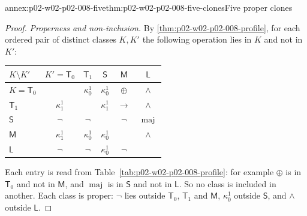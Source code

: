 \begin{annexitem}{annex:p02-w02-p02-008-five}{thm:p02-w02-p02-008-five-clones}{Five proper clones}
\begin{proof}
\emph{Properness and non-inclusion.}  By
\cref{thm:p02-w02-p02-008-profile}, for each ordered pair of distinct
classes \(K,K'\) the following operation lies in \(K\) and not in \(K'\):
\begin{center}\small
\begin{tabular}{@{}l|ccccc@{}}
\(K\setminus K'\) & \(K'=\mathsf T_0\) & \(\mathsf T_1\) & \(\mathsf S\) & \(\mathsf M\) & \(\mathsf L\)\\\hline
\(K=\mathsf T_0\) & & \(\kappa^1_0\) & \(\kappa^1_0\) & \(\oplus\) & \(\land\)\\
\(\mathsf T_1\) & \(\kappa^1_1\) & & \(\kappa^1_1\) & \(\to\) & \(\land\)\\
\(\mathsf S\) & \(\neg\) & \(\neg\) & & \(\neg\) & \(\operatorname{maj}\)\\
\(\mathsf M\) & \(\kappa^1_1\) & \(\kappa^1_0\) & \(\kappa^1_0\) & & \(\land\)\\
\(\mathsf L\) & \(\neg\) & \(\neg\) & \(\kappa^1_0\) & \(\neg\) &
\end{tabular}
\end{center}
Each entry is read from Table~\ref{tab:p02-w02-p02-008-profile}: for example
\(\oplus\) is in \(\mathsf T_0\) and not in \(\mathsf M\), and
\(\operatorname{maj}\) is in \(\mathsf S\) and not in \(\mathsf L\).  So no
class is included in another.  Each class is proper: \(\neg\) lies outside
\(\mathsf T_0\), \(\mathsf T_1\) and \(\mathsf M\), \(\kappa^1_0\) outside
\(\mathsf S\), and \(\land\) outside \(\mathsf L\).
\end{proof}
\end{annexitem}


